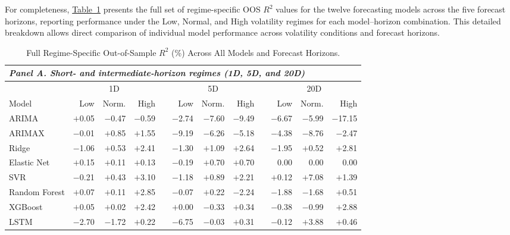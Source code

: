 \documentclass[12pt,twoside]{ord}
\begin{document}
For completeness, \hyperref[tab:full_regime_oos_r2]{Table~\ref*{tab:full_regime_oos_r2}} presents the full set of regime-specific OOS $R^2$ values for the twelve forecasting models across the five forecast horizons, reporting performance under the Low, Normal, and High volatility regimes for each model--horizon combination. This detailed breakdown allows direct comparison of individual model performance across volatility conditions and forecast horizons.

\begin{table}[htbp]
\centering
\caption{Full Regime-Specific Out-of-Sample $R^2$ (\%) Across All Models and Forecast Horizons.}\label{tab:full_regime_oos_r2}
{\footnotesize
\setlength{\tabcolsep}{4.5pt}
\begin{tabular}{lrrr@{\hspace{3pt}}c@{\hspace{3pt}}rrr@{\hspace{3pt}}c@{\hspace{3pt}}rrr}
\hline
\multicolumn{12}{l}{\textit{Panel A. Short- and intermediate-horizon regimes (1D, 5D, and 20D)}} \\
\hline
 & \multicolumn{3}{c}{1D} & & \multicolumn{3}{c}{5D} & & \multicolumn{3}{c}{20D} \\
\cline{2-4}\cline{6-8}\cline{10-12}
Model & Low & Norm. & High & & Low & Norm. & High & & Low & Norm. & High \\
\hline
ARIMA         & $+$0.05  & $-$0.47  & $-$0.59  & & $-$2.74  & $-$7.60  & $-$9.49  & & $-$6.67  & $-$5.99  & $-$17.15 \\
ARIMAX        & $-$0.01  & $+$0.85  & $+$1.55  & & $-$9.19  & $-$6.26  & $-$5.18  & & $-$4.38  & $-$8.76  & $-$2.47 \\
Ridge         & $-$1.06  & $+$0.53  & $+$2.41  & & $-$1.30  & $+$1.09  & $+$2.64  & & $-$1.95  & $+$0.52  & $+$2.81 \\
Elastic Net   & $+$0.15  & $+$0.11  & $+$0.13  & & $-$0.19  & $+$0.70  & $+$0.70  & & 0.00     & 0.00     & 0.00 \\
SVR           & $-$0.21  & $+$0.43  & $+$3.10  & & $-$1.18  & $+$0.89  & $+$2.21  & & $+$0.12  & $+$7.08  & $+$1.39 \\
Random Forest & $+$0.07  & $+$0.11  & $+$2.85  & & $-$0.07  & $+$0.22  & $-$2.24  & & $-$1.88  & $-$1.68  & $+$0.51 \\
XGBoost       & $+$0.05  & $+$0.02  & $+$2.42  & & $+$0.00  & $-$0.33  & $+$0.34  & & $-$0.38  & $-$0.99  & $+$2.88 \\
LSTM          & $-$2.70  & $-$1.72  & $+$0.22  & & $-$6.75  & $-$0.03  & $+$0.31  & & $-$0.12  & $+$3.88  & $+$0.46 \\

\end{tabular}}
\end{table}
\end{document}
